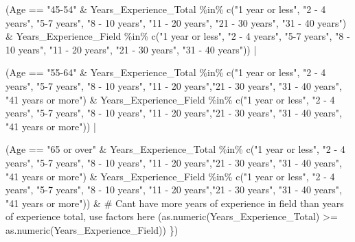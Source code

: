 \documentclass[
  letterpaper,
  DIV=11,
  numbers=noendperiod]{scrartcl}
\newenvironment{Shaded}{\begin{snugshade}}{\end{snugshade}}
\newcommand{\CommentTok}[1]{\textcolor[rgb]{0.37,0.37,0.37}{#1}}
\newcommand{\FunctionTok}[1]{\textcolor[rgb]{0.28,0.35,0.67}{#1}}
\newcommand{\NormalTok}[1]{\textcolor[rgb]{0.00,0.23,0.31}{#1}}
\newcommand{\SpecialCharTok}[1]{\textcolor[rgb]{0.37,0.37,0.37}{#1}}
\newcommand{\StringTok}[1]{\textcolor[rgb]{0.13,0.47,0.30}{#1}}
\begin{document}
\begin{Shaded}
\begin{Highlighting}[]
\NormalTok{  (Age }\SpecialCharTok{==} \StringTok{"45{-}54"} \SpecialCharTok{\&}\NormalTok{ Years\_Experience\_Total }\SpecialCharTok{\%in\%} \FunctionTok{c}\NormalTok{(}\StringTok{"1 year or less"}\NormalTok{, }\StringTok{"2 {-} 4 years"}\NormalTok{, }\StringTok{"5{-}7 years"}\NormalTok{, }\StringTok{"8 {-} 10 years"}\NormalTok{, }\StringTok{"11 {-} 20 years"}\NormalTok{, }\StringTok{"21 {-} 30 years"}\NormalTok{, }\StringTok{"31 {-} 40 years"}\NormalTok{) }\SpecialCharTok{\&}
\NormalTok{     Years\_Experience\_Field }\SpecialCharTok{\%in\%} \FunctionTok{c}\NormalTok{(}\StringTok{"1 year or less"}\NormalTok{, }\StringTok{"2 {-} 4 years"}\NormalTok{, }\StringTok{"5{-}7 years"}\NormalTok{, }\StringTok{"8 {-} 10 years"}\NormalTok{, }\StringTok{"11 {-} 20 years"}\NormalTok{, }\StringTok{"21 {-} 30 years"}\NormalTok{, }\StringTok{"31 {-} 40 years"}\NormalTok{)) }\SpecialCharTok{|}
    
\NormalTok{  (Age }\SpecialCharTok{==} \StringTok{"55{-}64"} \SpecialCharTok{\&}\NormalTok{ Years\_Experience\_Total }\SpecialCharTok{\%in\%} \FunctionTok{c}\NormalTok{(}\StringTok{"1 year or less"}\NormalTok{, }\StringTok{"2 {-} 4 years"}\NormalTok{, }\StringTok{"5{-}7 years"}\NormalTok{, }\StringTok{"8 {-} 10 years"}\NormalTok{, }\StringTok{"11 {-} 20 years"}\NormalTok{,}\StringTok{"21 {-} 30 years"}\NormalTok{, }\StringTok{"31 {-} 40 years"}\NormalTok{, }\StringTok{"41 years or more"}\NormalTok{) }\SpecialCharTok{\&}
\NormalTok{     Years\_Experience\_Field }\SpecialCharTok{\%in\%} \FunctionTok{c}\NormalTok{(}\StringTok{"1 year or less"}\NormalTok{, }\StringTok{"2 {-} 4 years"}\NormalTok{, }\StringTok{"5{-}7 years"}\NormalTok{, }\StringTok{"8 {-} 10 years"}\NormalTok{, }\StringTok{"11 {-} 20 years"}\NormalTok{,}\StringTok{"21 {-} 30 years"}\NormalTok{, }\StringTok{"31 {-} 40 years"}\NormalTok{, }\StringTok{"41 years or more"}\NormalTok{)) }\SpecialCharTok{|}
    
\NormalTok{  (Age }\SpecialCharTok{==} \StringTok{"65 or over"} \SpecialCharTok{\&}\NormalTok{ Years\_Experience\_Total }\SpecialCharTok{\%in\%} \FunctionTok{c}\NormalTok{(}\StringTok{"1 year or less"}\NormalTok{, }\StringTok{"2 {-} 4 years"}\NormalTok{, }\StringTok{"5{-}7 years"}\NormalTok{, }\StringTok{"8 {-} 10 years"}\NormalTok{, }\StringTok{"11 {-} 20 years"}\NormalTok{,}\StringTok{"21 {-} 30 years"}\NormalTok{, }\StringTok{"31 {-} 40 years"}\NormalTok{, }\StringTok{"41 years or more"}\NormalTok{) }\SpecialCharTok{\&}
\NormalTok{     Years\_Experience\_Field }\SpecialCharTok{\%in\%} \FunctionTok{c}\NormalTok{(}\StringTok{"1 year or less"}\NormalTok{, }\StringTok{"2 {-} 4 years"}\NormalTok{, }\StringTok{"5{-}7 years"}\NormalTok{, }\StringTok{"8 {-} 10 years"}\NormalTok{, }\StringTok{"11 {-} 20 years"}\NormalTok{,}\StringTok{"21 {-} 30 years"}\NormalTok{, }\StringTok{"31 {-} 40 years"}\NormalTok{, }\StringTok{"41 years or more"}\NormalTok{)) }\SpecialCharTok{\&}
    \CommentTok{\# Can\textquotesingle{}t have more years of experience in field than years of experience total, use factors here}
\NormalTok{  (}\FunctionTok{as.numeric}\NormalTok{(Years\_Experience\_Total) }\SpecialCharTok{\textgreater{}=} \FunctionTok{as.numeric}\NormalTok{(Years\_Experience\_Field))}
\NormalTok{\})}


\end{Highlighting}
\end{Shaded}
\end{document}
